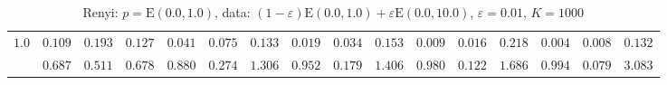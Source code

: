 \begin{table}[ht]
\begin{center}
\begin{tabular}{|c|ccc|ccc|ccc|ccc|ccc|}
$1.0$ & $ 0.109 $ & $ 0.193 $ & $ 0.127 $ & $ 0.041 $ & $ 0.075 $ & $ 0.133 $ & $ 0.019 $ & $ 0.034 $ & $ 0.153 $ & $ 0.009 $ & $ 0.016 $ & $ 0.218 $ & $ 0.004 $ & $ 0.008 $ & $ 0.132 $\\ 
 & $ 0.687 $ & $ 0.511 $ & $ 0.678 $ & $ 0.880 $ & $ 0.274 $ & $ 1.306 $ & $ 0.952 $ & $ 0.179 $ & $ 1.406 $ & $ 0.980 $ & $ 0.122 $ & $ 1.686 $ & $ 0.994 $ & $ 0.079 $ & $ 3.083 $\\ 
\hline 
\end{tabular}
\caption{Renyi: $p = \mathrm{E}(0.0,1.0)$, data: $(1-\varepsilon)\mathrm{E}(0.0,1.0) + \varepsilon \mathrm{E}(0.0,10.0)$, $\varepsilon =  0.01$, $K = 1000$} 
\end{center}
\end{table}
